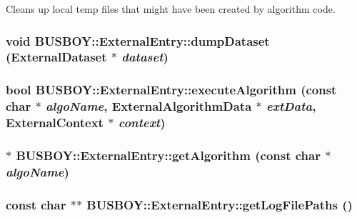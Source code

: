 Cleans up local temp files that might have been created by algorithm code. \hypertarget{classBUSBOY_1_1ExternalEntry_a96e304914f39c07ea58b7c534bff1920}{
\subsubsection[{dumpDataset}]{\setlength{\rightskip}{0pt plus 5cm}void BUSBOY::ExternalEntry::dumpDataset ({\bf ExternalDataset} $\ast$ {\em dataset})}}
\label{classBUSBOY_1_1ExternalEntry_a96e304914f39c07ea58b7c534bff1920}
\hypertarget{classBUSBOY_1_1ExternalEntry_a39907b7f41c1d742dc78e62e2f28918b}{
\subsubsection[{executeAlgorithm}]{\setlength{\rightskip}{0pt plus 5cm}bool BUSBOY::ExternalEntry::executeAlgorithm (const char $\ast$ {\em algoName}, \/  {\bf ExternalAlgorithmData} $\ast$ {\em extData}, \/  {\bf ExternalContext} $\ast$ {\em context})}}
\label{classBUSBOY_1_1ExternalEntry_a39907b7f41c1d742dc78e62e2f28918b}
\hypertarget{classBUSBOY_1_1ExternalEntry_a5fd7376ad89521b4de73a4c70fc6b2b2}{
\subsubsection[{getAlgorithm}]{ $\ast$ BUSBOY::ExternalEntry::getAlgorithm (const char $\ast$ {\em algoName})}}
\label{classBUSBOY_1_1ExternalEntry_a5fd7376ad89521b4de73a4c70fc6b2b2}
\hypertarget{classBUSBOY_1_1ExternalEntry_a35379f7683120c533337e0fa5ebc079a}{
\subsubsection[{getLogFilePaths}]{\setlength{\rightskip}{0pt plus 5cm}const char $\ast$$\ast$ BUSBOY::ExternalEntry::getLogFilePaths ()}}
\label{classBUSBOY_1_1ExternalEntry_a35379f7683120c533337e0fa5ebc079a}


